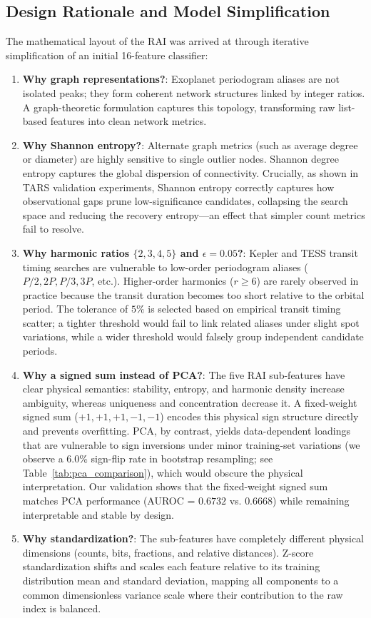 \subsection{Design Rationale and Model Simplification} \label{sec:method_rationale}
The mathematical layout of the RAI was arrived at through iterative simplification of an initial 16-feature classifier:
\begin{enumerate}
\item \textbf{Why graph representations?}: Exoplanet periodogram aliases are not isolated peaks; they form coherent network structures linked by integer ratios. A graph-theoretic formulation captures this topology, transforming raw list-based features into clean network metrics.
\item \textbf{Why Shannon entropy?}: Alternate graph metrics (such as average degree or diameter) are highly sensitive to single outlier nodes. Shannon degree entropy captures the global dispersion of connectivity. Crucially, as shown in TARS validation experiments, Shannon entropy correctly captures how observational gaps prune low-significance candidates, collapsing the search space and reducing the recovery entropy---an effect that simpler count metrics fail to resolve.
\item \textbf{Why harmonic ratios $\{2, 3, 4, 5\}$ and $\epsilon = 0.05$?}: Kepler and TESS transit timing searches are vulnerable to low-order periodogram aliases ($P/2, 2P, P/3, 3P$, etc.). Higher-order harmonics ($r \ge 6$) are rarely observed in practice because the transit duration becomes too short relative to the orbital period. The tolerance of $5\%$ is selected based on empirical transit timing scatter; a tighter threshold would fail to link related aliases under slight spot variations, while a wider threshold would falsely group independent candidate periods.
\item \textbf{Why a signed sum instead of PCA?}: The five RAI sub-features have clear physical semantics: stability, entropy, and harmonic density increase ambiguity, whereas uniqueness and concentration decrease it. A fixed-weight signed sum ($+1, +1, +1, -1, -1$) encodes this physical sign structure directly and prevents overfitting. PCA, by contrast, yields data-dependent loadings that are vulnerable to sign inversions under minor training-set variations (we observe a 6.0\% sign-flip rate in bootstrap resampling; see Table~\ref{tab:pca_comparison}), which would obscure the physical interpretation. Our validation shows that the fixed-weight signed sum matches PCA performance (AUROC = $0.6732$ vs. $0.6668$) while remaining interpretable and stable by design.
\item \textbf{Why standardization?}: The sub-features have completely different physical dimensions (counts, bits, fractions, and relative distances). Z-score standardization shifts and scales each feature relative to its training distribution mean and standard deviation, mapping all components to a common dimensionless variance scale where their contribution to the raw index is balanced.
\end{enumerate}

